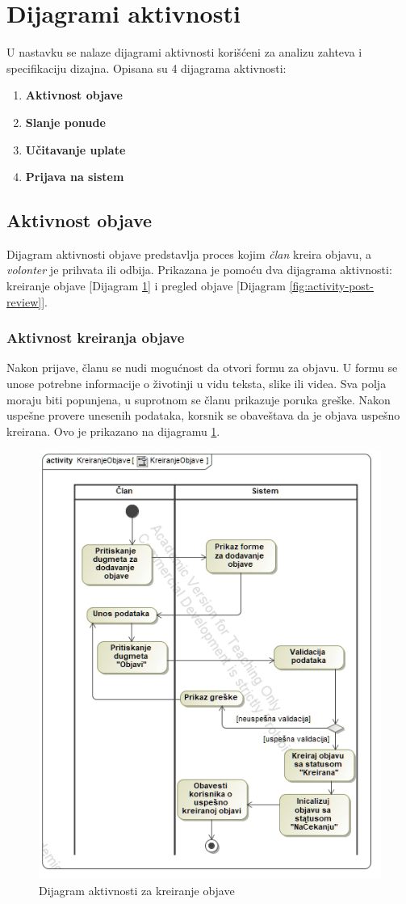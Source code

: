 \section{Dijagrami aktivnosti}
\par U nastavku se nalaze dijagrami aktivnosti korišćeni za analizu zahteva i specifikaciju dizajna.
Opisana su 4 dijagrama aktivnosti:
\begin{enumerate}
    \item \textbf{Aktivnost objave}
    \item \textbf{Slanje ponude}
    \item \textbf{Učitavanje uplate}
    \item \textbf{Prijava na sistem}
\end{enumerate}
\subsection{Aktivnost objave}
\par Dijagram aktivnosti objave predstavlja proces kojim \textit{član} kreira objavu, a \textit{volonter} je prihvata ili odbija.
Prikazana je pomoću dva dijagrama aktivnosti: kreiranje objave [Dijagram \ref{fig:activity-create-post}] i pregled objave [Dijagram \ref{fig:activity-post-review}].
\subsubsection*{Aktivnost kreiranja objave}
\par Nakon prijave, članu se nudi mogućnost da otvori formu za objavu. U formu se unose potrebne informacije o životinji u vidu teksta, slike ili videa.
Sva polja moraju biti popunjena, u suprotnom se članu prikazuje poruka greške. Nakon uspešne provere unesenih podataka, korsnik se obaveštava da je 
objava uspešno kreirana. Ovo je prikazano na dijagramu \ref{fig:activity-create-post}.
\begin{figure}[h]
    \centering
    \includegraphics[width=\textwidth, height=0.75\textwidth]{img/activity-create-post.jpg}
    \caption{Dijagram aktivnosti za kreiranje objave}
    \label{fig:activity-create-post}
\end{figure}
